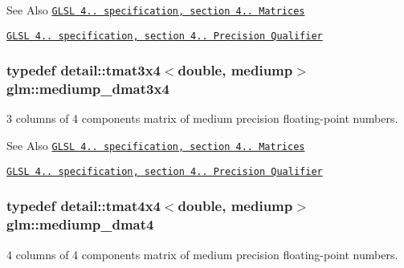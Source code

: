 \begin{DoxySeeAlso}{See Also}
\href{http://www.opengl.org/registry/doc/GLSLangSpec.4.20.8.pdf}{\tt G\-L\-S\-L 4.. specification, section 4.. Matrices} 

\href{http://www.opengl.org/registry/doc/GLSLangSpec.4.20.8.pdf}{\tt G\-L\-S\-L 4.. specification, section 4.. Precision Qualifier} 
\end{DoxySeeAlso}
\hypertarget{group__core__precision_gaedd814e706701200b13b86fc6fd7b373}{
\subsubsection[{mediump\-\_\-dmat3x4}]{\setlength{\rightskip}{0pt plus 5cm}typedef detail\-::tmat3x4$<$double, mediump$>$ {\bf glm\-::mediump\-\_\-dmat3x4}}}\label{group__core__precision_gaedd814e706701200b13b86fc6fd7b373}
3 columns of 4 components matrix of medium precision floating-\/point numbers.

\begin{DoxySeeAlso}{See Also}
\href{http://www.opengl.org/registry/doc/GLSLangSpec.4.20.8.pdf}{\tt G\-L\-S\-L 4.. specification, section 4.. Matrices} 

\href{http://www.opengl.org/registry/doc/GLSLangSpec.4.20.8.pdf}{\tt G\-L\-S\-L 4.. specification, section 4.. Precision Qualifier} 
\end{DoxySeeAlso}
\hypertarget{group__core__precision_ga73de517f040f7d50746bbe273a396685}{
\subsubsection[{mediump\-\_\-dmat4}]{\setlength{\rightskip}{0pt plus 5cm}typedef detail\-::tmat4x4$<$double, mediump$>$ {\bf glm\-::mediump\-\_\-dmat4}}}\label{group__core__precision_ga73de517f040f7d50746bbe273a396685}
4 columns of 4 components matrix of medium precision floating-\/point numbers.


